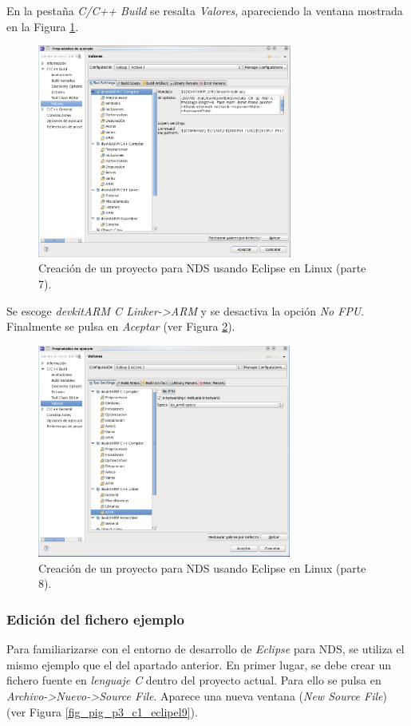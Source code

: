 En la pestaña \textit{C/C++ Build} se resalta \textit{Valores}, apareciendo la ventana mostrada en la Figura \ref{fig_pig_p3_c1_eclipel7}.


\begin{figure}[t]
	\centering
	\includegraphics[height=7cm]{./Figuras/C2/c2_instan7.png}
	\caption{Creación de un proyecto para NDS usando Eclipse en Linux (parte 7).}
	\label{fig_pig_p3_c1_eclipel7}
\end{figure}

Se escoge \textit{devkitARM C Linker->ARM} y se desactiva la opción \textit{No FPU}. Finalmente se pulsa en \textit{Aceptar} (ver Figura \ref{fig_pig_p3_c1_eclipel8}).

\begin{figure}[t]
	\centering
	\includegraphics[height=7cm]{./Figuras/C2/c2_instan8.png}
	\caption{Creación de un proyecto para NDS usando Eclipse en Linux (parte 8).}
	\label{fig_pig_p3_c1_eclipel8}
\end{figure}


\subsubsection{Edición del fichero ejemplo}
Para familiarizarse con el entorno de desarrollo de \textit{Eclipse} para NDS, se utiliza el mismo ejemplo que el del apartado anterior.  En primer lugar, se debe crear un fichero fuente en \textit{lenguaje C} dentro del proyecto actual. Para ello se pulsa en \textit{Archivo->Nuevo->Source File}. Aparece una nueva ventana (\textit{New Source File}) (ver Figura \ref{fig_pig_p3_c1_eclipel9}).

